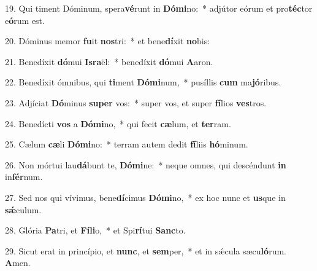 19. Qui timent Dóminum, spera\textbf{vé}runt in \textbf{Dó}\textbf{mi}no:~*  adjútor eórum et pro\textbf{téc}tor e\textbf{ó}rum est.\

20. Dóminus memor \textbf{fu}it \textbf{nos}tri:~*  et bene\textbf{dí}xit \textbf{no}bis:\

21. Benedíxit \textbf{dó}mui \textbf{Is}\textbf{ra}ël:~*  benedíxit \textbf{dó}mui \textbf{A}aron.\

22. Benedíxit ómnibus, qui \textbf{ti}ment \textbf{Dó}\textbf{mi}num,~*  pusíllis \textbf{cum} ma\textbf{jó}ribus.\

23. Adjíciat \textbf{Dó}minus \textbf{su}\textbf{per} vos:~*  super vos, et super \textbf{fí}lios \textbf{ves}tros.\

24. Benedícti \textbf{vos} a \textbf{Dó}\textbf{mi}no,~*  qui fecit \textbf{cæ}lum, et \textbf{ter}ram.\

25. Cælum \textbf{cæ}li \textbf{Dó}\textbf{mi}no:~*  terram autem dedit \textbf{fí}liis \textbf{hó}minum.\

26. Non mórtui lau\textbf{dá}bunt te, \textbf{Dó}\textbf{mi}ne:~*  neque omnes, qui descéndunt \textbf{in} in\textbf{fér}num.\

27. Sed nos qui vívimus, bene\textbf{dí}cimus \textbf{Dó}\textbf{mi}no,~*  ex hoc nunc et \textbf{us}que in \textbf{sǽ}culum.\

28. Glória \textbf{Pa}tri, et \textbf{Fí}\textbf{li}o,~*  et Spi\textbf{rí}tui \textbf{Sanc}to.\

29. Sicut erat in princípio, et \textbf{nunc}, et \textbf{sem}per,~*  et in sǽcula sæcu\textbf{ló}rum. \textbf{A}men.\

